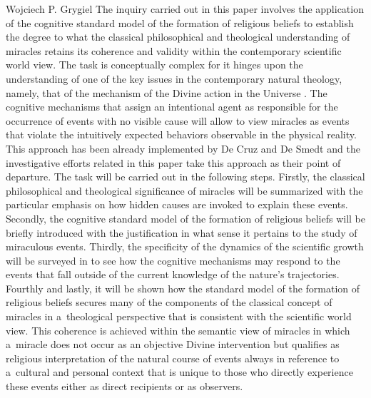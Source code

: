 \begin{artengenv}{Wojciech P. Grygiel}
The inquiry carried out in this paper involves the application of the cognitive standard model of the formation of religious beliefs to establish the degree to what the classical philosophical and theological understanding of miracles retains its coherence and validity within the contemporary scientific world view. The task is conceptually complex for it hinges upon the understanding of one of the key issues in the contemporary natural theology, namely, that of the mechanism of the Divine action in the Universe
\parencites[e.g.][]{russell_divine_1995}[][]{slomka_gods_2021}. %
 The cognitive mechanisms that assign an intentional agent as responsible for the occurrence of events with no visible cause will allow to view miracles as events that violate the intuitively expected behaviors observable in the physical reality. This approach has been already implemented by De Cruz and De Smedt 
\parencite[][pp.155–178]{de_cruz_natural_2015} %
 and the investigative efforts related in this paper take this approach as their point of departure. The task will be carried out in the following steps. Firstly, the classical philosophical and theological significance of miracles will be summarized with the particular emphasis on how hidden causes are invoked to explain these events. Secondly, the cognitive standard model of the formation of religious beliefs will be briefly introduced with the justification in what sense it pertains to the study of miraculous events. Thirdly, the specificity of the dynamics of the scientific growth will be surveyed in to see how the cognitive mechanisms may respond to the events that fall outside of the current knowledge of the nature’s trajectories. Fourthly and lastly, it will be shown how the standard model of the formation of religious beliefs secures many of the components of the classical concept of miracles in a~theological perspective that is consistent with the scientific world view. This coherence is achieved within the semantic view of miracles in which a~miracle does not occur as an objective Divine intervention but qualifies as religious interpretation of the natural course of events always in reference to a~cultural and personal context that is unique to those who directly experience these events either as direct recipients or as observers.


\end{artengenv}

